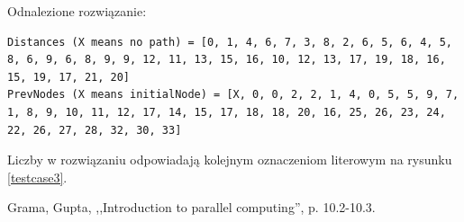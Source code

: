\documentclass{article}
\begin{document}
Odnalezione rozwiązanie:

\begin{lstlisting}
Distances (X means no path) = [0, 1, 4, 6, 7, 3, 8, 2, 6, 5, 6, 4, 5, 8, 6, 9, 6, 8, 9, 9, 12, 11, 13, 15, 16, 10, 12, 13, 17, 19, 18, 16, 15, 19, 17, 21, 20]
PrevNodes (X means initialNode) = [X, 0, 0, 2, 2, 1, 4, 0, 5, 5, 9, 7, 1, 8, 9, 10, 11, 12, 17, 14, 15, 17, 18, 18, 20, 16, 25, 26, 23, 24, 22, 26, 27, 28, 32, 30, 33] 
\end{lstlisting}

Liczby w rozwiązaniu odpowiadają kolejnym oznaczeniom literowym na rysunku \ref{testcase3}.





\clearpage
{}
\begin{thebibliography}{9}
 Grama, Gupta, ,,Introduction to parallel computing'', p. 10.2-10.3.

\end{thebibliography}
\end{document}

